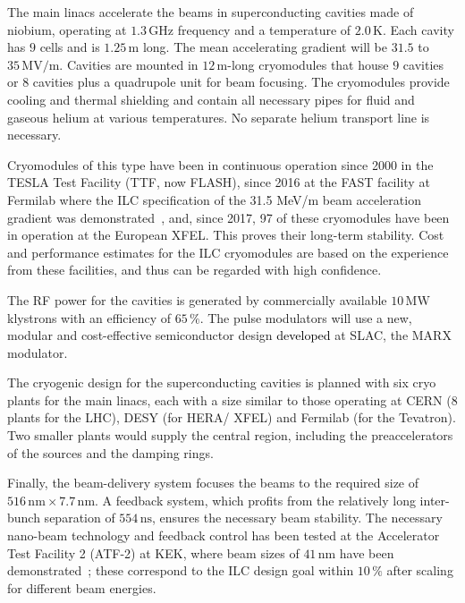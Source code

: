 \documentclass[%
reprint,
 floatfix,
 amsmath,amssymb,
 aps,
]{revtex4-1}
\newcommand{\jim}[1]{\textcolor{black}{#1}}
\begin{document}
The main linacs accelerate the beams in superconducting cavities made of niobium, operating at $1.3\,{\mathrm{GHz}}$ frequency and a temperature of $2.0\,{\mathrm{K}}$. 
Each cavity has $9$ cells and is $1.25\,{\mathrm{m}}$ long. 
The mean accelerating gradient will be $31.5$ to $35\,{\mathrm{MV/m}}$.
Cavities are mounted in $12\,{\mathrm{m}}$-long cryomodules that house $9$ cavities or $8$ cavities plus a quadrupole unit for beam focusing. 
The cryomodules provide cooling and thermal shielding and contain all
necessary pipes for fluid and gaseous helium at various temperatures. 
No separate helium transport line is necessary.

Cryomodules of this type have been in continuous operation since 2000 in the TESLA Test Facility (TTF, now FLASH), since 2016 at the FAST facility at Fermilab where the ILC specification of the 31.5 MeV/m beam acceleration gradient was demonstrated~\cite{Broemmelsiek:2018iqr},  and, since 2017, 97 of these cryomodules have been in operation at the European XFEL.
This proves their 
long-term stability. 
Cost and performance estimates for the ILC cryomodules are based on
the 
experience from these facilities, and thus can be regarded with high confidence. 

The RF power for the cavities is generated by commercially available $10\,{\mathrm{MW}}$ klystrons with an efficiency of $65\,\%$. 
The pulse modulators will use a new, modular and cost-effective semiconductor design \jim{developed} at SLAC, the MARX modulator.

The cryogenic design for the superconducting cavities is planned with six cryo plants for the
main linacs, each with a size similar to those operating at CERN (8
plants for the LHC), 
DESY (for HERA/ XFEL) and Fermilab (for the Tevatron).
Two smaller plants would supply the central region, including the preaccelerators of the sources and the damping rings. 

Finally, the beam-delivery system focuses the beams 
to the required size of $516\,{\mathrm{nm}} \times 7.7\,{\mathrm{nm}} $. 
A feedback system, which profits from the relatively long
 inter-bunch separation of $554\,{\mathrm{ns}}$, ensures the necessary beam stability. 
The necessary nano-beam technology and feedback control has been tested at the Accelerator Test Facility 2 (ATF-2) at KEK, where beam sizes of $41\,{\mathrm{nm}}$ have been demonstrated~\cite{Okugi:2017jji}; these correspond to the ILC design goal within $10\,\%$ after scaling for different beam energies.
 
\end{document}
